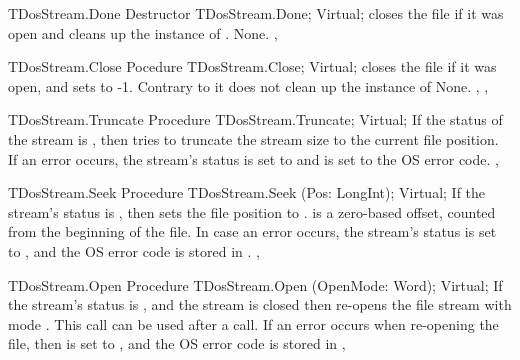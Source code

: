 \begin{procedure}{TDosStream.Done}
\Declaration
Destructor TDosStream.Done; Virtual;
\Description
{} closes the file if it was open and cleans up the 
instance of . 
\Errors
None.
\SeeAlso
{},
\end{procedure}

\begin{procedure}{TDosStream.Close}
\Declaration
Pocedure TDosStream.Close; Virtual;
\Description
{} closes the file if it was open, and sets  to -1. 
Contrary to  it does not clean up the instance
of 
\Errors
None.
\SeeAlso
{}, ,
\end{procedure}

\begin{procedure}{TDosStream.Truncate}
\Declaration
Procedure TDosStream.Truncate; Virtual;
\Description
If the status of the stream is , then  tries to
truncate the stream size to the current file position.
\Errors
If an error occurs, the stream's status is set to  and
 is set to the OS error code.
\SeeAlso
{}, 
\end{procedure}

\begin{procedure}{TDosStream.Seek}
\Declaration
Procedure TDosStream.Seek (Pos: LongInt); Virtual;
\Description
If the stream's status is , then  sets the 
file position to .  is a zero-based offset, counted from
the beginning of the file.
\Errors
In case an error occurs, the stream's status is set to ,
and the OS error code is stored in .
\SeeAlso
{}, 
\end{procedure}

\begin{procedure}{TDosStream.Open}
\Declaration
Procedure TDosStream.Open (OpenMode: Word); Virtual;
\Description
If the stream's status is , and the stream is closed then
 re-opens the file stream with mode .
This call can be used after a  call.
\Errors
If an error occurs when re-opening the file, then  is set
to , and the OS error code is stored in 
\SeeAlso
{}, 
\end{procedure}

